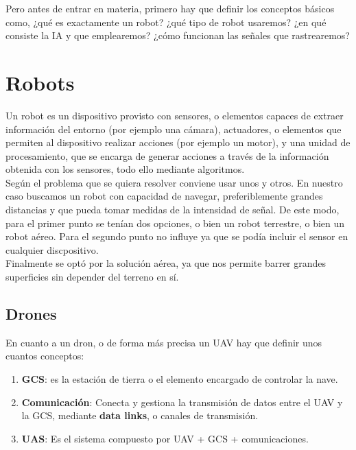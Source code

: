 Pero antes de entrar en materia, primero hay que definir los conceptos básicos como, ¿qué es exactamente un robot? ¿qué tipo de robot usaremos? ¿en qué consiste la \ac{IA} y que emplearemos? ¿cómo funcionan las señales que rastrearemos?

\section{Robots}
\label{sec:robots}

Un robot es un dispositivo provisto con sensores, o elementos capaces de extraer información del entorno (por ejemplo una cámara), actuadores, o elementos que permiten al dispositivo realizar acciones (por ejemplo un motor), y una unidad de procesamiento, que se encarga de generar acciones a través de la información obtenida con los sensores, todo ello mediante algoritmos.\\

Según el problema que se quiera resolver conviene usar unos y otros. En nuestro caso buscamos un robot con capacidad de navegar, preferiblemente grandes distancias y que pueda tomar medidas de la intensidad de señal. De este modo, para el primer punto se tenían dos opciones, o bien un robot terrestre, o bien un robot aéreo. Para el segundo punto no influye ya que se podía incluir el sensor en cualquier discpositivo.\\

Finalmente se optó por la solución aérea, ya que nos permite barrer grandes superficies sin depender del terreno en sí.

\subsection{Drones}
\label{subsec:drones}

En cuanto a un dron, o de forma más precisa un \ac{UAV} hay que definir unos cuantos conceptos:

\begin{enumerate}
	\item \textbf{\ac{GCS}}: es la estación de tierra o el elemento encargado de controlar la nave.

	\item \textbf{Comunicación}: Conecta y gestiona la transmisión de datos entre el \ac{UAV} y la \ac{GCS}, mediante \textbf{data links}, o canales de transmisión.
	
    \item \textbf{\ac{UAS}}: Es el sistema compuesto por \ac{UAV} + \ac{GCS} + comunicaciones.
\end{enumerate}

